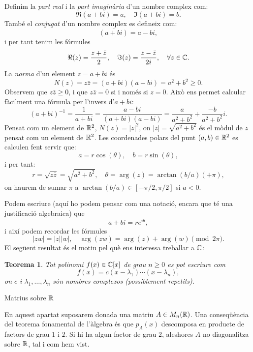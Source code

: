 \documentclass[
  11pt,
]{book}
\makeatletter
\numberwithin{dummy}{section}
\theoremstyle{maincolornumbox}
\newtheorem{theorem}{TTTT}[chapter]
\newtheorem{theoremeT}{Teorema}[chapter]
\theoremstyle{blacknumex}
\theoremstyle{blacknumbox}
\theoremstyle{maincolornum}
\renewenvironment{theorem}{\begin{tBox}\begin{theoremeT}}{\end{theoremeT}\end{tBox}}
\renewcommand{\section}{\@startsection{section}{1}{\z@}
{-4ex \@plus -1ex \@minus -.4ex}
{1ex \@plus.2ex }
{\normalfont\large\sffamily\bfseries}}
\makeatother
\begin{document}
Definim la \emph{part real} i la \emph{part imaginària} d'un nombre complex com:
\[\Re(a+bi) = a,\quad \Im(a+bi) = b.\] També el \emph{conjugat} d'un nombre
complex es defineix com: \[\overline{(a+bi)} = a-bi,\] i per tant tenim
les fórmules
\[\Re(z) = \frac{z+\bar z}{2},\quad \Im(z)=\frac{z-\bar z}{2i},\quad \forall z\in\mathbb{C}.\]
La \emph{norma} d'un element \(z=a+bi\) és
\[N(z) = z\bar z = (a+bi)(a-bi) = a^2+b^2\geq 0.\] Observem que
\(z\bar z \geq 0\), i que \(z\bar z = 0\) si i només si \(z=0\). Això ens
permet calcular fàcilment una fórmula per l'invers d'\(a+bi\):
\[(a+bi)^{-1} = \frac{1}{a+bi} = \frac{a-bi}{(a+bi)(a-bi)} = \frac{a}{a^2+b^2}+\frac{-b}{a^2+b^2}i.\]
Pensat com un element de \(\mathbb{R}^2\), \(N(z)=|z|^2\), on \(|z|=\sqrt{a^2+b^2}\)
és el mòdul de \(z\) pensat com un element de \(\mathbb{R}^2\). Les coordenades
polars del punt \((a,b)\in\mathbb{R}^2\) es calculen fent servir que:
\[a = r\cos(\theta),\quad b = r\sin(\theta),\] i per tant:
\[r = \sqrt{z\bar z}=\sqrt{a^2+b^2},\quad \theta = \arg(z) = \arctan(b/a) (+\pi),\]
on haurem de sumar \(\pi\) a \(\arctan(b/a)\in[-\pi/2,\pi/2]\) si \(a<0\).

Podem escriure (aquí ho podem pensar com una notació, encara que té una
justificació algebraica) que \[a+bi = re^{i\theta},\] i així podem
recordar les fórmules
\[|zw|=|z||w|,\quad \arg(zw)=\arg(z)+\arg(w)\pmod{2\pi}.\] El següent
resultat és el motiu pel què ens interessa treballar a \(\mathbb{C}\):

\begin{theorem}
Tot polinomi \(f(x)\in \mathbb{C}[x]\) de grau \(n\geq 0\) es pot escriure com
\[f(x) = c (x-\lambda_1)\cdots (x-\lambda_n),\] on \(c\) i
\(\lambda_1,\ldots,\lambda_n\) són nombres complexos (possiblement
repetits).
\end{theorem}

\hypertarget{matrius-sobre-r}{%
\section{\texorpdfstring{Matrius sobre \(\mathbb{R}\)}{Matrius sobre \textbackslash R}}\label{matrius-sobre-r}}

En aquest apartat suposarem donada una matriu \(A\in M_n(\mathbb{R})\). Una
conseqüència del teorema fonamental de l'àlgebra és que \(p_A(x)\)
descomposa en producte de factors de grau \(1\) i \(2\). Si hi ha algun
factor de grau \(2\), aleshores \(A\) no diagonalitza sobre \(\mathbb{R}\), tal i com
hem vist.
\end{document}
